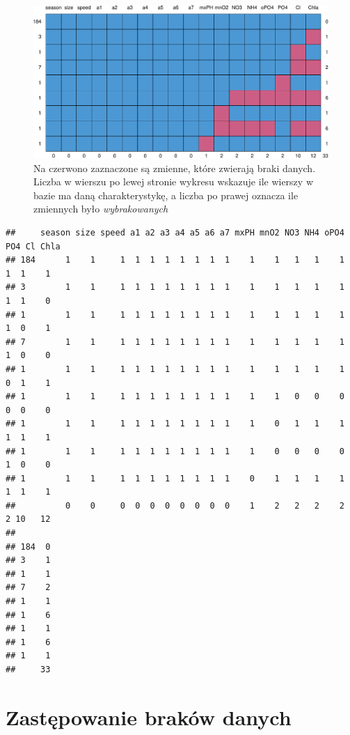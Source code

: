 \documentclass[
]{book}
\theoremstyle{plain}
\theoremstyle{definition}
\theoremstyle{definition}
\theoremstyle{definition}
\theoremstyle{definition}
\theoremstyle{remark}
\begin{document}
\begin{figure}
\centering
\includegraphics{EksploracjaDanych_files/figure-latex/mice1-1.pdf}
\caption{\label{fig:mice1}Na czerwono zaznaczone są zmienne, które zwierają braki danych. Liczba w wierszu po lewej stronie wykresu wskazuje ile wierszy w bazie ma daną charakterystykę, a liczba po prawej oznacza ile zmiennych było \emph{wybrakowanych}}
\end{figure}

\begin{verbatim}
##     season size speed a1 a2 a3 a4 a5 a6 a7 mxPH mnO2 NO3 NH4 oPO4 PO4 Cl Chla
## 184      1    1     1  1  1  1  1  1  1  1    1    1   1   1    1   1  1    1
## 3        1    1     1  1  1  1  1  1  1  1    1    1   1   1    1   1  1    0
## 1        1    1     1  1  1  1  1  1  1  1    1    1   1   1    1   1  0    1
## 7        1    1     1  1  1  1  1  1  1  1    1    1   1   1    1   1  0    0
## 1        1    1     1  1  1  1  1  1  1  1    1    1   1   1    1   0  1    1
## 1        1    1     1  1  1  1  1  1  1  1    1    1   0   0    0   0  0    0
## 1        1    1     1  1  1  1  1  1  1  1    1    0   1   1    1   1  1    1
## 1        1    1     1  1  1  1  1  1  1  1    1    0   0   0    0   1  0    0
## 1        1    1     1  1  1  1  1  1  1  1    0    1   1   1    1   1  1    1
##          0    0     0  0  0  0  0  0  0  0    1    2   2   2    2   2 10   12
##       
## 184  0
## 3    1
## 1    1
## 7    2
## 1    1
## 1    6
## 1    1
## 1    6
## 1    1
##     33
\end{verbatim}

\hypertarget{zastux119powanie-brakuxf3w-danych}{%
\section{Zastępowanie braków danych}\label{zastux119powanie-brakuxf3w-danych}}
\end{document}

